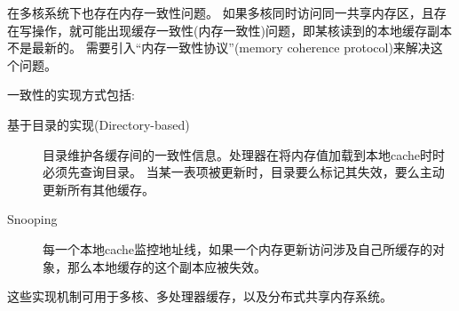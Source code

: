在多核系统下也存在内存一致性问题。
如果多核同时访问同一共享内存区，且存在写操作，就可能出现缓存一致性(内存一致性)问题，即某核读到的本地缓存副本不是最新的。
需要引入“内存一致性协议”(memory coherence protocol)来解决这个问题。

一致性的实现方式包括:
\begin{description}
\item[基于目录的实现(Directory-based)]目录维护各缓存间的一致性信息。处理器在将内存值加载到本地cache时时必须先查询目录。
当某一表项被更新时，目录要么标记其失效，要么主动更新所有其他缓存。
\item[Snooping]每一个本地cache监控地址线，如果一个内存更新访问涉及自己所缓存的对象，那么本地缓存的这个副本应被失效。
\end{description}
这些实现机制可用于多核、多处理器缓存，以及分布式共享内存系统。

